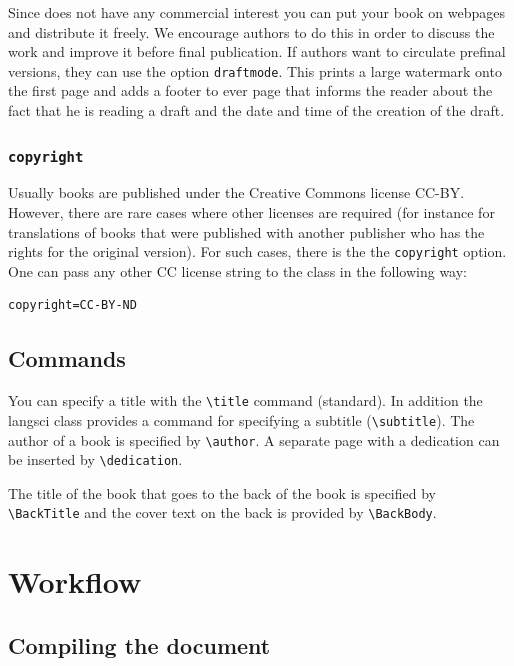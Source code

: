Since \lsp does not have any commercial interest you can put your book on webpages and distribute it
freely. We encourage authors to do this in order to discuss the work and improve it before final
publication. If authors want to circulate prefinal versions, they can use the option
\texttt{draftmode}. This prints a large watermark onto the first page and adds a footer to ever page
that informs the reader about the fact that he is reading a draft and the date and time of the
creation of the draft.


\subsubsection{\texttt{copyright}}

Usually \lsp books are published under the Creative Commons license CC-BY. However, there are rare
cases where other licenses are required (for instance for translations of books that were published
with another publisher who has the rights for the original version). For such cases, there is the
 the \texttt{copyright} option. One can pass any other CC license string to the
\latex class in the following way:
\begin{verbatim}
copyright=CC-BY-ND
\end{verbatim}


\subsection{Commands}

You can specify a title with the \verb+\title+ command (\latex standard). In addition the langsci
class provides a command for specifying a subtitle (\verb+\subtitle+). The author of a book is
specified by \verb+\author+. A separate page with a dedication can be inserted by \verb+\dedication+.

The title of the book that goes to the back of the book is specified by \verb+\BackTitle+ and the
cover text on the back is provided by \verb+\BackBody+.


\section{Workflow}

\subsection{Compiling the document}
\label{sec-latex-compilation}

